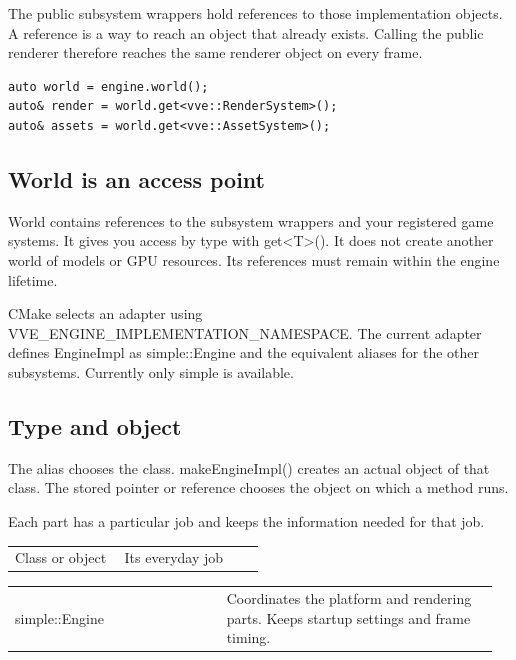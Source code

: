 \documentclass[11pt,a4paper]{article}
\begin{document}
The public subsystem wrappers hold references to those implementation objects. A reference is a way to reach an object that already exists. Calling the public renderer therefore reaches the same renderer object on every frame.

\begin{lstlisting}[language={}]
auto world = engine.world();
auto& render = world.get<vve::RenderSystem>();
auto& assets = world.get<vve::AssetSystem>();
\end{lstlisting}

\subsection*{World is an access point}
World contains references to the subsystem wrappers and your registered game systems. It gives you access by type with get<T>(). It does not create another world of models or GPU resources. Its references must remain within the engine lifetime.

CMake selects an adapter using VVE\_ENGINE\_IMPLEMENTATION\_NAMESPACE. The current adapter defines EngineImpl as simple::Engine and the equivalent aliases for the other subsystems. Currently only simple is available.

\subsection*{Type and object}
The alias chooses the class. makeEngineImpl() creates an actual object of that class. The stored pointer or reference chooses the object on which a method runs.

\label{core-25}
Each part has a particular job and keeps the information needed for that job.

{\small
\begin{longtable}{@{}p{0.42\linewidth}p{0.54\linewidth}@{}}
Class or object & Its everyday job \\
\end{longtable}
}

{\small
\begin{longtable}{@{}p{0.42\linewidth}p{0.54\linewidth}@{}}
simple::Engine & Coordinates the platform and rendering parts. Keeps startup settings and frame timing. \\
\end{longtable}
}
\end{document}
